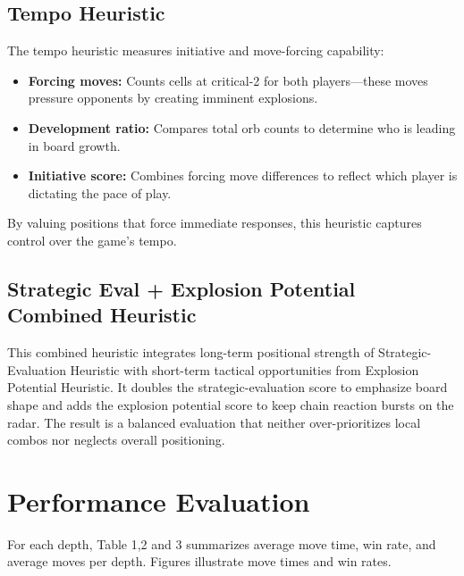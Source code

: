 \documentclass[12pt]{article}
\begin{document}
\subsection{Tempo Heuristic}
The tempo heuristic measures initiative and move-forcing capability:
\begin{itemize}
  \item \textbf{Forcing moves:} Counts cells at critical-2 for both players—these moves pressure opponents by creating imminent explosions.
  \item \textbf{Development ratio:} Compares total orb counts to determine who is leading in board growth.
  \item \textbf{Initiative score:} Combines forcing move differences to reflect which player is dictating the pace of play.
\end{itemize}
By valuing positions that force immediate responses, this heuristic captures control over the game's tempo.

\subsection{Strategic Eval + Explosion Potential Combined Heuristic}
This combined heuristic integrates long-term positional strength of Strategic-Evaluation Heuristic with short-term tactical opportunities from Explosion Potential Heuristic. It doubles the strategic-evaluation score to emphasize board shape and adds the explosion potential score to keep chain reaction bursts on the radar. The result is a balanced evaluation that neither over-prioritizes local combos nor neglects overall positioning.

\section{Performance Evaluation}

For each depth, Table 1,2 and 3 summarizes average move time, win rate, and average moves per depth. Figures illustrate move times and win rates.

\end{document}
